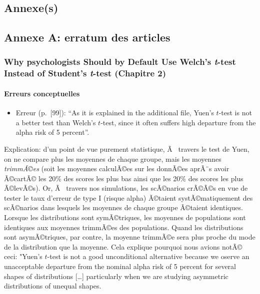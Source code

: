 \clearpage



\begin{appendix}
\hypertarget{annexes}{%
\section{Annexe(s)}\label{annexes}}

\hypertarget{annexe-a-erratum-des-articles}{%
\subsection{Annexe A: erratum des
articles}\label{annexe-a-erratum-des-articles}}

\hypertarget{why-psychologists-should-by-default-use-welchs-t-test-instead-of-students-t-test-chapitre-2}{%
\subsubsection{\texorpdfstring{Why psychologists Should by Default Use
Welch's \emph{t}-test Instead of Student's \emph{t}-test (Chapitre
2)}{Why psychologists Should by Default Use Welch's t-test Instead of Student's t-test (Chapitre 2)}}\label{why-psychologists-should-by-default-use-welchs-t-test-instead-of-students-t-test-chapitre-2}}

\hypertarget{erreurs-conceptuelles}{%
\paragraph{Erreurs conceptuelles}\label{erreurs-conceptuelles}}

\begin{itemize}
\tightlist
\item
  Erreur (p.~{[}99{]}): ``As it is explained in the additional file,
  Yuen's \(t\)-test is not a better test than Welch's \(t\)-test, since
  it often suffers high departure from the alpha risk of 5 percent''.
\end{itemize}

Explication: d'un point de vue purement statistique, Ã~ travers le test
de Yuen, on ne compare plus les moyennes de chaque groupe, mais les
moyennes \emph{trimmÃ©es} (soit les moyennes calculÃ©es sur les donnÃ©es
aprÃ¨s avoir Ã©cartÃ© les 20\% des scores les plus bas ainsi que les
20\% des scores les plus Ã©levÃ©s). Or, Ã~ travers nos simulations, les
scÃ©narios crÃ©Ã©s en vue de tester le taux d'erreur de type I (risque
alpha) Ã©taient systÃ©matiquement des scÃ©narios dans lesquels les
moyennes de chaque groupe Ã©taient identiques. Lorsque les distributions
sont symÃ©triques, les moyennes de populations sont identiques aux
moyennes trimmÃ©es des populations. Quand les distributions sont
asymÃ©triques, par contre, la moyenne trimmÃ©e sera plus proche du mode
de la distribution que la moyenne. Cela explique pourquoi nous avions
notÃ© ceci: "Yuen's \(t\)-test is not a good unconditional alternative
because we oserve an unacceptable departure from the nominal alpha risk
of 5 percent for several shapes of distributions {[}\ldots{]}
particularly when we are studying asymmetric distributions of unequal
shapes.


\end{appendix}
